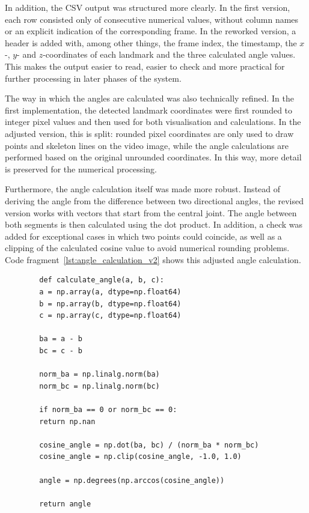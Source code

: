 In addition, the CSV output was structured more clearly. In the first version, each row consisted only of consecutive numerical values, without column names or an explicit indication of the corresponding frame. In the reworked version, a header is added with, among other things, the frame index, the timestamp, the $x$-, $y$- and $z$-coordinates of each landmark and the three calculated angle values. This makes the output easier to read, easier to check and more practical for further processing in later phases of the system.

The way in which the angles are calculated was also technically refined. In the first implementation, the detected landmark coordinates were first rounded to integer pixel values and then used for both visualisation and calculations. In the adjusted version, this is split: rounded pixel coordinates are only used to draw points and skeleton lines on the video image, while the angle calculations are performed based on the original unrounded coordinates. In this way, more detail is preserved for the numerical processing.

Furthermore, the angle calculation itself was made more robust. Instead of deriving the angle from the difference between two directional angles, the revised version works with vectors that start from the central joint. The angle between both segments is then calculated using the dot product. In addition, a check was added for exceptional cases in which two points could coincide, as well as a clipping of the calculated cosine value to avoid numerical rounding problems. Code fragment~\ref{lst:angle_calculation_v2} shows this adjusted angle calculation.

\begin{listing}[H]
    \begin{verbatim}
        def calculate_angle(a, b, c):
        a = np.array(a, dtype=np.float64)
        b = np.array(b, dtype=np.float64)
        c = np.array(c, dtype=np.float64)
        
        ba = a - b
        bc = c - b
        
        norm_ba = np.linalg.norm(ba)
        norm_bc = np.linalg.norm(bc)
        
        if norm_ba == 0 or norm_bc == 0:
        return np.nan
        
        cosine_angle = np.dot(ba, bc) / (norm_ba * norm_bc)
        cosine_angle = np.clip(cosine_angle, -1.0, 1.0)
        
        angle = np.degrees(np.arccos(cosine_angle))
        
        return angle
    \end{verbatim}
    \caption{Adjusted function for calculating joint angles based on vector geometry from \href{https://github.com/Tristanvanspeybroeck/bachelorproef-Methodologie-25-26-Van-Speybroeck-Tristan/blob/main/Methodologie/pose_project/src/pose-detection_skelet.py}{\texttt{pose-detection\_skelet.py}}}
    \label{lst:angle_calculation_v2}
\end{listing}

